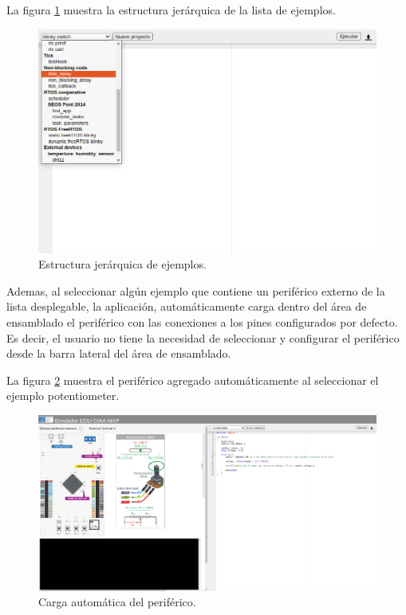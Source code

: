 La figura \ref{fig:listExamples} muestra la estructura jerárquica de la lista de ejemplos.

\begin{figure}[ht]
	\centering
	\includegraphics[scale=.42]{./Figures/listExamples.jpg}
	\caption{Estructura jerárquica de ejemplos. }
	\label{fig:listExamples}
\end{figure}

Ademas, al seleccionar algún ejemplo que contiene un periférico externo de la lista desplegable, la aplicación, automáticamente carga dentro del área de ensamblado el periférico con las conexiones a los pines configurados por defecto. Es decir, el usuario no tiene la necesidad de seleccionar y configurar el periférico desde la barra lateral del área de ensamblado.

La figura \ref{fig:cargarPeriferico} muestra el periférico agregado automáticamente al seleccionar el ejemplo \textquotedbl potentiometer\textquotedbl.

\begin{figure}[ht]
	\centering
	\includegraphics[scale=.21]{./Figures/cargarPeriferico.png}
	\caption{Carga automática del periférico. }
	\label{fig:cargarPeriferico}
\end{figure}

